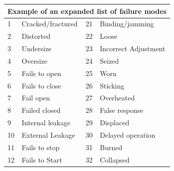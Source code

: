 \documentclass[./dissertation.tex]{subfiles}
\begin{document}
\begin{table}[]
\begin{tabular}{@{}llll@{}}
\toprule
\multicolumn{4}{l}{Example of an expanded list of failure modes}                                                                                      \\ \midrule
1                          & Cracked/fractured                                 & 21                       & Binding/jamming                           \\
2                          & Distorted                                         & 22                       & Loose                                     \\
3                          & Undersize                                         & 23                       & Incorrect Adjustment                       \\
4                          & Oversize                                          & 24                       & Seized                                    \\
5                          & Fails to open                                     & 25                       & Worn                                      \\
6                          & Fails to close                                    & 26                       & Sticking                                  \\
7                          & Fail open                                         & 27                       & Overheated                                \\
8                          & Failed closed                                     & 28                       & False response                            \\
9                          & Internal leakage                                  & 29                       & Displaced                                 \\
10                         & External Leakage                                  & 30                       & Delayed operation                         \\
11                         & Fails to stop                                     & 31                       & Burned                                    \\
12                         & Fails to Start                                    & 32                       & Collapsed                                 \\

\end{tabular}
\end{table}
\end{document}
